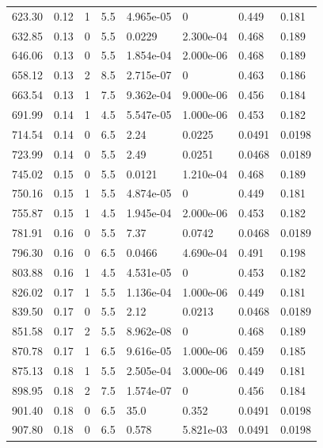 \documentclass[preview]{standalone}
\begin{document}
{{{\begin{tabular}{L{1.2cm}C{1.2cm} C{0.3cm}C{0.5cm} C{1.4cm}C{1.4cm} C{1.4cm}C{1.4cm}}
  623.30  &  0.12  & 1     & 5.5 &  4.965e-05  & 0  & 0.449 &  0.181   \\ 
  632.85  &  0.13  & 0     & 5.5 &  0.0229  & 2.300e-04  & 0.468 &  0.189   \\ 
  646.06  &  0.13  & 0     & 5.5 &  1.854e-04  & 2.000e-06  & 0.468 &  0.189   \\ 
  658.12  &  0.13  & 2     & 8.5 &  2.715e-07  & 0  & 0.463 &  0.186   \\ 
  663.54  &  0.13  & 1     & 7.5 &  9.362e-04  & 9.000e-06  & 0.456 &  0.184   \\ 
  691.99  &  0.14  & 1     & 4.5 &  5.547e-05  & 1.000e-06  & 0.453 &  0.182   \\ 
  714.54  &  0.14  & 0     & 6.5 &  2.24  & 0.0225  & 0.0491 &  0.0198   \\ 
  723.99  &  0.14  & 0     & 5.5 &  2.49  & 0.0251  & 0.0468 &  0.0189   \\ 
  745.02  &  0.15  & 0     & 5.5 &  0.0121  & 1.210e-04  & 0.468 &  0.189   \\ 
  750.16  &  0.15  & 1     & 5.5 &  4.874e-05  & 0  & 0.449 &  0.181   \\ 
  755.87  &  0.15  & 1     & 4.5 &  1.945e-04  & 2.000e-06  & 0.453 &  0.182   \\ 
  781.91  &  0.16  & 0     & 5.5 &  7.37  & 0.0742  & 0.0468 &  0.0189   \\ 
  796.30  &  0.16  & 0     & 6.5 &  0.0466  & 4.690e-04  & 0.491 &  0.198   \\ 
  803.88  &  0.16  & 1     & 4.5 &  4.531e-05  & 0  & 0.453 &  0.182   \\ 
  826.02  &  0.17  & 1     & 5.5 &  1.136e-04  & 1.000e-06  & 0.449 &  0.181   \\ 
  839.50  &  0.17  & 0     & 5.5 &  2.12  & 0.0213  & 0.0468 &  0.0189   \\ 
  851.58  &  0.17  & 2     & 5.5 &  8.962e-08  & 0  & 0.468 &  0.189   \\ 
  870.78  &  0.17  & 1     & 6.5 &  9.616e-05  & 1.000e-06  & 0.459 &  0.185   \\ 
  875.13  &  0.18  & 1     & 5.5 &  2.505e-04  & 3.000e-06  & 0.449 &  0.181   \\ 
  898.95  &  0.18  & 2     & 7.5 &  1.574e-07  & 0  & 0.456 &  0.184   \\ 
  901.40  &  0.18  & 0     & 6.5 &  35.0  & 0.352  & 0.0491 &  0.0198   \\ 
  907.80  &  0.18  & 0     & 6.5 &  0.578  & 5.821e-03  & 0.0491 &  0.0198   \\ 

\end{tabular}}}}
\end{document}
